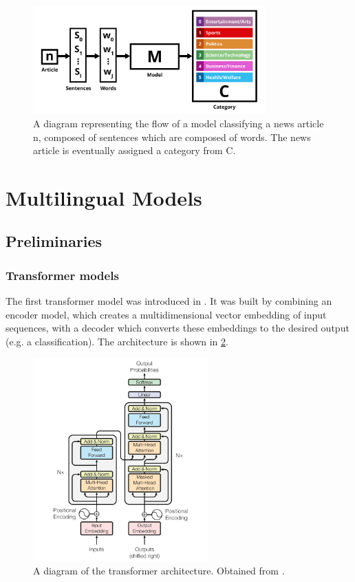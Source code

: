 \documentclass{l4proj}
\begin{document}
 \begin{figure}[h]
\centering
\includegraphics[width=0.8\textwidth]{images/Task Definition.png}
\caption{A diagram representing the flow of a model classifying a news article n, composed of sentences which are composed of words. The news article is eventually assigned a category from C.}
\label{fig:task-definition}
\end{figure}


\section{Multilingual Models}
\subsection{Preliminaries}
\label{section:preliminaries}
\subsubsection{Transformer models} \hfill \par
The first transformer model was introduced in \cite{vaswani2017attention}. It was built by combining an encoder model, which creates a multidimensional vector embedding of input sequences, with a decoder which converts these embeddings to the desired output (e.g. a classification). The architecture is shown in \ref{fig:transformer-architecture}.

 \begin{figure}[h]
\centering
\includegraphics[width=0.6\textwidth]{images/transformer-architecture.png}
\caption{A diagram of the transformer architecture. Obtained from \cite{vaswani2017attention}.}
\label{fig:transformer-architecture}
\end{figure}
\end{document}
